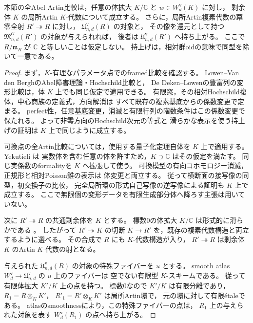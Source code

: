 \begin{lemma}[係数体の拡大と任意のArtin試験環]
\label{lem:abel-versality-arbitrary-residue-field}
本節の全Abel Artin比較は，任意の体拡大 $K/\mathbb C$ と
$w\in W_d^{\mathrm v}(K)$ に対し，
剰余体 $K$ の局所Artin $K$-代数について成立する。
さらに，局所Artin複素代数の冪零全射 $R'\twoheadrightarrow R$ に対し，
$\mathfrak U_{n,d}^{\mathrm v}(R)$ の対象と，
その像を還元として持つ $\mathfrak M^{\mathcal O}_{n,d}(R')$ の対象が与えられれば，
後者は $\mathfrak U_{n,d}^{\mathrm v}(R')$ へ持ち上がる。
ここで $R/\mathfrak m_R$ が $\mathbb C$ と等しいことは仮定しない。
持上げは，相対群oidの意味で同型を除いて一意である。
\end{lemma}
\begin{proof}
まず，$K$-有理なパラメータ点でのframed比較を確認する。
Lowen--Van den BerghのAbel障害理論・Hochschild比較と，
De Deken--Lowenの豊富列の変形比較は，体 $K$ 上でも同じ仮定で適用できる。
有限窓，その相対Hochschild複体，中心商族の定義式，方向解消は
すべて既存の複素基底からの係数変更で定まる。
perfect性，任意基底変更，消滅と有限行列の階数条件はこの係数変更で保たれる。
よって非零方向のHochschild次元の等式と
滑らかな表示を使う持上げの証明は $K$ 上で同じように成立する。

可換点の全Artin比較については，使用する量子化定理自体を $K$ 上で適用する。
Yekutieli \cite[Theorem~11.1, Corollaries~7.5, 11.2]{Yekutieli2015}は
実数体を含む任意の体を許すため，$K\supset\mathbb C$ はその仮定を満たす。
同じ実係数のformalityを $K$ へ拡張して使う。
可換模型の有向コホモロジー消滅，正規形と相対Poisson錐の表示は
体変更と両立する。
従って横断面の接写像の同型，初交換子の比較，
完全局所環の形式自己写像の逆写像による証明も $K$ 上で成立する。
ここで無限個の変形データを有限生成部分体へ降ろす主張は用いていない。

次に $R'\twoheadrightarrow R$ の共通剰余体を $K$ とする。
標数0の体拡大 $K/\mathbb C$ は形式的に滑らかである
\cite[Lemma~10.158.8, Tag~0321]{StacksProject}。
したがって $R'\twoheadrightarrow K$ の切断
$K\to R'$ を，既存の複素代数構造と両立するように選べる。
その合成で $R$ にも $K$-代数構造が入り，
$R'\twoheadrightarrow R$ は剰余体 $K$ のArtin $K$-代数の射となる。

与えられた $\mathfrak U_{n,d}^{\mathrm v}(R)$ の対象の特殊ファイバーを $u$ とする。
smooth atlas $W_d^{\mathrm v}\to\mathfrak U_{n,d}^{\mathrm v}$ の $u$ 上のファイバーは
空でない有限型 $K$-スキームである。
従って有限体拡大 $K'/K$ 上の点を持つ。
標数0なので $K'/K$ は有限分離であり，
$R_1=R\otimes_KK'$，
$R'_1=R'\otimes_KK'$ は局所Artin環で，
元の環に対して有限\'etaleである。
atlasのsmoothnessにより，この特殊ファイバーの点は，
$R_1$ 上の与えられた対象を表す
$W_d^{\mathrm v}(R_1)$ の点へ持ち上がる。


\end{proof}
